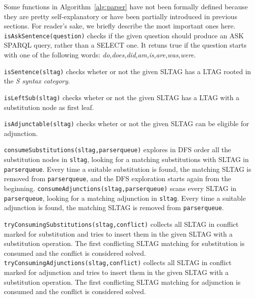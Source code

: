 Some functions in Algorithm~\ref{alg:parser} have not been formally defined because they are pretty self-explanatory or have been partially introduced in previous sections.
%
For reader's sake, we briefly describe the most important ones here.
%
\texttt{isAskSentence(question)} checks if the given question should produce an ASK SPARQL query, rather than a SELECT one. It retuns true if the question starts with one of the following words: \textit{do,does,did,am,is,are,was,were}.

\texttt{isSentence(sltag)} checks wheter or not the given SLTAG has a LTAG rooted in the \textit{S syntax category}.

\texttt{isLeftSub(sltag)} checks wheter or not the given SLTAG has a LTAG with a substitution node as first leaf.

\texttt{isAdjunctable(sltag)} checks wheter or not the given SLTAG can be eligible for adjunction.

\texttt{consumeSubstitutions(sltag,parserqueue)} explores in DFS order all the substitution nodes in \texttt{sltag}, looking for a matching substitutions with SLTAG in \texttt{parserqueue}. 
Every time a suitable substitution is found, the matching SLTAG is removed from \texttt{parserqueue}, and the DFS exploration starts again from the beginning. 
%
\texttt{consumeAdjunctions(sltag,parserqueue)} scans every SLTAG in \texttt{parserqueue}, looking for a matching adjunction in \texttt{sltag}.
Every time a suitable adjunction is found, the matching SLTAG is removed from \texttt{parserqueue}.

\texttt{tryConsumingSubstitutions(sltag,conflict)} collects all SLTAG in conflict marked for substitution and tries to insert them in the given SLTAG with a substitution operation. The first conflicting SLTAG matching for substitution is consumed and the conflict is considered solved.
%
\texttt{tryConsumingAdjunctions(sltag,conflict)} collects all SLTAG in conflict marked for adjunction and tries to insert them in the given SLTAG with a substitution operation. The first conflicting SLTAG matching for adjunction is consumed and the conflict is considered solved.